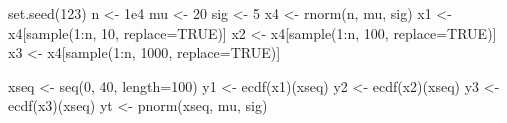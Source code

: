 \documentclass[
  13,
  letterpaper,
]{report}
\newenvironment{Shaded}{\begin{snugshade}}{\end{snugshade}}
\newcommand{\AttributeTok}[1]{\textcolor[rgb]{0.40,0.45,0.13}{#1}}
\newcommand{\ConstantTok}[1]{\textcolor[rgb]{0.56,0.35,0.01}{#1}}
\newcommand{\DecValTok}[1]{\textcolor[rgb]{0.68,0.00,0.00}{#1}}
\newcommand{\FloatTok}[1]{\textcolor[rgb]{0.68,0.00,0.00}{#1}}
\newcommand{\FunctionTok}[1]{\textcolor[rgb]{0.28,0.35,0.67}{#1}}
\newcommand{\NormalTok}[1]{\textcolor[rgb]{0.00,0.23,0.31}{#1}}
\newcommand{\OtherTok}[1]{\textcolor[rgb]{0.00,0.23,0.31}{#1}}
\newcommand{\SpecialCharTok}[1]{\textcolor[rgb]{0.37,0.37,0.37}{#1}}
\begin{document}
\begin{Shaded}
\begin{Highlighting}[]
\FunctionTok{set.seed}\NormalTok{(}\DecValTok{123}\NormalTok{)}
\NormalTok{n }\OtherTok{\textless{}{-}} \FloatTok{1e4}
\NormalTok{mu }\OtherTok{\textless{}{-}} \DecValTok{20}
\NormalTok{sig }\OtherTok{\textless{}{-}} \DecValTok{5}
\NormalTok{x4 }\OtherTok{\textless{}{-}} \FunctionTok{rnorm}\NormalTok{(n, mu, sig)}
\NormalTok{x1 }\OtherTok{\textless{}{-}}\NormalTok{ x4[}\FunctionTok{sample}\NormalTok{(}\DecValTok{1}\SpecialCharTok{:}\NormalTok{n, }\DecValTok{10}\NormalTok{, }\AttributeTok{replace=}\ConstantTok{TRUE}\NormalTok{)]}
\NormalTok{x2 }\OtherTok{\textless{}{-}}\NormalTok{ x4[}\FunctionTok{sample}\NormalTok{(}\DecValTok{1}\SpecialCharTok{:}\NormalTok{n, }\DecValTok{100}\NormalTok{, }\AttributeTok{replace=}\ConstantTok{TRUE}\NormalTok{)]}
\NormalTok{x3 }\OtherTok{\textless{}{-}}\NormalTok{ x4[}\FunctionTok{sample}\NormalTok{(}\DecValTok{1}\SpecialCharTok{:}\NormalTok{n, }\DecValTok{1000}\NormalTok{, }\AttributeTok{replace=}\ConstantTok{TRUE}\NormalTok{)]}

\NormalTok{xseq }\OtherTok{\textless{}{-}} \FunctionTok{seq}\NormalTok{(}\DecValTok{0}\NormalTok{, }\DecValTok{40}\NormalTok{, }\AttributeTok{length=}\DecValTok{100}\NormalTok{)}
\NormalTok{y1 }\OtherTok{\textless{}{-}} \FunctionTok{ecdf}\NormalTok{(x1)(xseq)}
\NormalTok{y2 }\OtherTok{\textless{}{-}} \FunctionTok{ecdf}\NormalTok{(x2)(xseq)}
\NormalTok{y3 }\OtherTok{\textless{}{-}} \FunctionTok{ecdf}\NormalTok{(x3)(xseq)}
\NormalTok{yt }\OtherTok{\textless{}{-}} \FunctionTok{pnorm}\NormalTok{(xseq, mu, sig)}


\end{Highlighting}
\end{Shaded}
\end{document}
